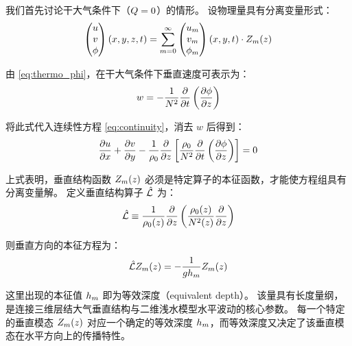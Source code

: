 我们首先讨论干大气条件下（$Q = 0$）的情形。
设物理量具有分离变量形式：
\begin{equation}
    \begin{pmatrix} u \\ v \\ \phi \end{pmatrix}(x, y, z, t)
    = \sum_{m=0}^{\infty}
    \begin{pmatrix} u_m \\ v_m \\ \phi_m \end{pmatrix}(x, y, t)
    \cdot Z_m(z)
    \label{eq:separation_ansatz}
\end{equation}

由 \eqref{eq:thermo_phi}，在干大气条件下垂直速度可表示为：
\begin{equation}
    w = -\frac{1}{\bvfreq^2}\pde{}{\timevar}\left(\pde{\gravpotential}{z}\right)
    \label{eq:w_from_phi}
\end{equation}

将此式代入连续性方程 \eqref{eq:continuity}，消去 $w$ 后得到：
\begin{equation}
    \pde{u}{x} + \pde{v}{y} - \frac{1}{\density_0}\pde{}{z}\left[\frac{\density_0}{\bvfreq^2}\pde{}{\timevar}\left(\pde{\gravpotential}{z}\right)\right] = 0
    \label{eq:combined_continuity}
\end{equation}

上式表明，垂直结构函数 $Z_m(z)$ 必须是特定算子的本征函数，才能使方程组具有分离变量解。
定义垂直结构算子 $\hat{\mathcal{L}}$ 为：
\begin{equation}
    \vertop \equiv \frac{1}{\density_0(z)}\pde{}{z}\left(\frac{\density_0(z)}{\bvfreq^2(z)}\pde{}{z}\right)
    \label{eq:vertical_operator}
\end{equation}

则垂直方向的本征方程为：
\begin{equation}
    \hat{\mathcal{L}} Z_m(z) = -\frac{1}{g h_m} Z_m(z)
    \label{eq:vertical_eigen}
\end{equation}

这里出现的本征值 $h_m$ 即为等效深度（equivalent depth）。
该量具有长度量纲，是连接三维层结大气垂直结构与二维浅水模型水平波动的核心参数。
每一个特定的垂直模态 $Z_m(z)$ 对应一个确定的等效深度 $h_m$，而等效深度又决定了该垂直模态在水平方向上的传播特性。

